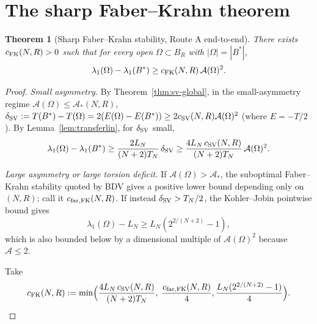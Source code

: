 \documentclass[11pt]{article}
\newtheorem{theorem}{Theorem}
\theoremstyle{definition}
\newcommand{\abs}[1]{\left|#1\right|}
\begin{document}
\section{The sharp Faber--Krahn theorem}\label{sec:final}

\begin{theorem}[Sharp Faber--Krahn stability, Route A end-to-end]\label{thm:fk-final}
There exists $c_{\rm FK}(N,R)>0$ such that for every open
$\Omega\subset B_R$ with $\abs{\Omega}=\abs{B^*}$,
\[
\lambda_1(\Omega)-\lambda_1(B^*)\ge c_{\rm FK}(N,R)\,\mathcal A(\Omega)^2.
\]
\end{theorem}

\begin{proof}
\emph{Small asymmetry.} By Theorem~\ref{thm:sv-global}, in the small-asymmetry
regime $\mathcal A(\Omega)\le\mathcal A_*(N,R)$,
$\delta_{\rm SV}:=T(B^*)-T(\Omega)=2(E(\Omega)-E(B^*))
\ge 2c_{\rm SV}(N,R)\mathcal A(\Omega)^2$
(where $E=-T/2$). By Lemma~\ref{lem:transferlin}, for $\delta_{\rm SV}$ small,
\[
\lambda_1(\Omega)-\lambda_1(B^*)\ge\frac{2L_N}{(N+2)T_N}\,\delta_{\rm SV}
\ge\frac{4L_N\,c_{\rm SV}(N,R)}{(N+2)T_N}\,\mathcal A(\Omega)^2.
\]

\emph{Large asymmetry or large torsion deficit.} If
$\mathcal A(\Omega)>\mathcal A_*$, the suboptimal Faber--Krahn stability
quoted by BDV gives a positive lower bound depending only on $(N,R)$; call it
$c_{\rm far,FK}(N,R)$. If instead $\delta_{\rm SV}>T_N/2$, the Kohler--Jobin
pointwise bound gives
\[
\lambda_1(\Omega)-L_N\ge L_N(2^{2/(N+2)}-1),
\]
which is also bounded below by a dimensional multiple of
$\mathcal A(\Omega)^2$ because $\mathcal A\le2$.

Take
\[
c_{\rm FK}(N,R):=\min\Bigl(\frac{4L_N\,c_{\rm SV}(N,R)}{(N+2)T_N},\;\frac{c_{\rm far,FK}(N,R)}{4},
\frac{L_N(2^{2/(N+2)}-1)}{4}\Bigr).
\]
\end{proof}
\end{document}
